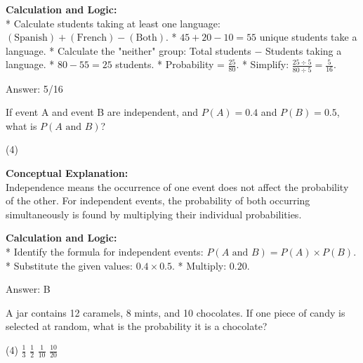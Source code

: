 \documentclass[11pt,paper=a4,answers]{exam}
\begin{document}
\begin{questions}
\begin{solution}
\textbf{Calculation and Logic:} \\
* Calculate students taking at least one language: $(\text{Spanish}) + (\text{French}) - (\text{Both})$.
* $45 + 20 - 10 = 55$ unique students take a language.
* Calculate the "neither" group: Total students $-$ Students taking a language.
* $80 - 55 = 25$ students.
* Probability = $\frac{25}{80}$.
* Simplify: $\frac{25 \div 5}{80 \div 5} = \frac{5}{16}$.

\vspace{30pt}

Answer: \colorbox{yellow!100}{5/16}
\end{solution}

\vspace{60pt}

\question
If event A and event B are independent, and $P(A) = 0.4$ and $P(B) = 0.5$, what is $P(A \text{ and } B)$?
\begin{tasks}(4)
\end{tasks}

\begin{solution}
\textbf{Conceptual Explanation:} \\
Independence means the occurrence of one event does not affect the probability of the other. For independent events, the probability of both occurring simultaneously is found by multiplying their individual probabilities.

\vspace{30pt}

\textbf{Calculation and Logic:} \\
* Identify the formula for independent events: $P(A \text{ and } B) = P(A) \times P(B)$.
* Substitute the given values: $0.4 \times 0.5$.
* Multiply: $0.20$.

\vspace{30pt}

Answer: \colorbox{yellow!100}{B}
\end{solution}

\vspace{60pt}

\question
A jar contains 12 caramels, 8 mints, and 10 chocolates. If one piece of candy is selected at random, what is the probability it is a chocolate?
\begin{tasks}(4)
    \task $\frac{1}{3}$
    \task $\frac{1}{2}$
    \task $\frac{1}{10}$
    \task $\frac{10}{20}$
\end{tasks}


\end{questions}
\end{document}
